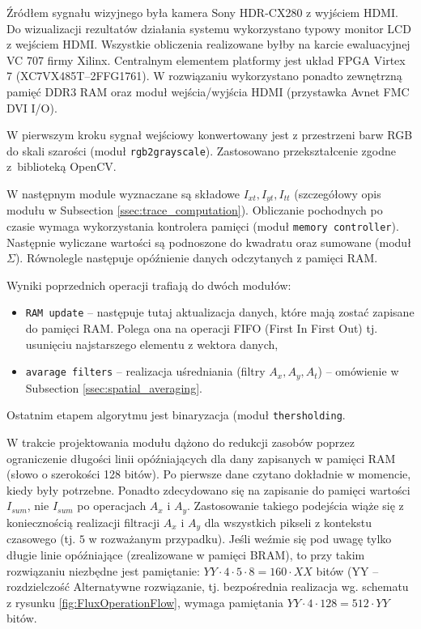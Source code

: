 \documentclass[10pt,a4paper]{article}
\begin{document}
Źródłem sygnału wizyjnego była kamera Sony HDR-CX280 z wyjściem HDMI.
Do wizualizacji rezultatów działania systemu wykorzystano typowy monitor LCD z wejściem HDMI.
Wszystkie obliczenia realizowane byłby na karcie ewaluacyjnej VC 707 firmy Xilinx.
Centralnym elementem platformy jest układ FPGA Virtex 7 (XC7VX485T–2FFG1761).
W rozwiązaniu wykorzystano ponadto zewnętrzną pamięć DDR3 RAM oraz moduł wejścia/wyjścia  HDMI (przystawka Avnet FMC DVI I/O).

W pierwszym kroku sygnał wejściowy konwertowany jest z przestrzeni barw RGB do skali szarości (moduł \texttt{rgb2grayscale}).
Zastosowano przekształcenie zgodne z~biblioteką OpenCV.

W następnym module wyznaczane są składowe $I_{xt}, I_{yt}, I_{tt}$ (szczegółowy opis modułu w Subsection \ref{ssec:trace_computation}).
Obliczanie pochodnych po czasie wymaga wykorzystania kontrolera pamięci (moduł \texttt{memory controller}).
Następnie wyliczane wartości są podnoszone do kwadratu oraz sumowane (moduł $\Sigma$).
Równolegle następuje opóźnienie danych odczytanych z pamięci RAM.

Wyniki poprzednich operacji trafiają do dwóch modułów:
\begin{itemize}
\item \texttt{RAM update} -- następuje tutaj aktualizacja danych, które mają zostać zapisane do pamięci RAM. Polega ona na operacji FIFO (First In First Out) tj. usunięciu najstarszego elementu z wektora danych, %
\item  \texttt{avarage filters} -- realizacja uśredniania (filtry $A_x, A_y, A_t$) -- omówienie w Subsection \ref{ssec:spatial_averaging}.
\end{itemize}
Ostatnim etapem algorytmu jest binaryzacja (moduł \texttt{thersholding}.

W trakcie projektowania modułu dążono do redukcji zasobów poprzez ograniczenie długości linii opóźniających dla dany zapisanych w pamięci RAM (słowo o szerokości 128 bitów).
Po pierwsze dane czytano dokładnie w momencie, kiedy były potrzebne.
Ponadto zdecydowano się na zapisanie do pamięci wartości $I_{sum}$, nie $I_{sum}$ po operacjach $A_x$ i $A_y$.
Zastosowanie takiego podejścia wiąże się z koniecznością realizacji filtracji $A_x$ i $A_y$ dla wszystkich pikseli z kontekstu czasowego (tj. $5$ w rozważanym przypadku).
Jeśli weźmie się pod uwagę tylko długie linie opóźniające (zrealizowane w pamięci BRAM), to przy takim rozwiązaniu niezbędne jest pamiętanie: $YY \cdot 4 \cdot 5 \cdot 8 = 160 \cdot XX $ bitów (YY -- rozdzielczość %
Alternatywne rozwiązanie, tj. bezpośrednia realizacja wg. schematu z rysunku \ref{fig:FluxOperationFlow}, wymaga pamiętania $YY \cdot 4 \cdot 128 = 512 \cdot YY$ bitów.
\end{document}
